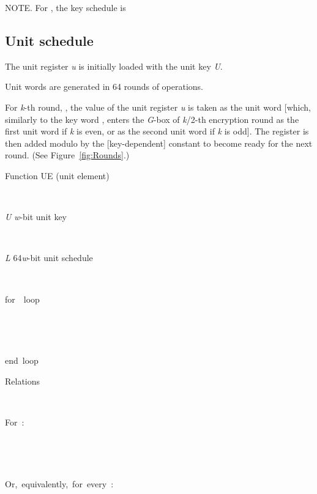 \documentclass[a4paper,oneside,english]{amsart}
\numberwithin{equation}{section}
\numberwithin{figure}{section}
\newenvironment{lyxlist}[1]
{\begin{list}{}
{\settowidth{\labelwidth}{#1}
 \setlength{\leftmargin}{\labelwidth}
 \addtolength{\leftmargin}{\labelsep}
 \renewcommand{\makelabel}[1]{##1\hfil}}}
{\end{list}}
\newenvironment{lyxcode}
{\par\begin{list}{}{
\setlength{\rightmargin}{\leftmargin}
\setlength{\listparindent}{0pt}\raggedright
\setlength{\itemsep}{0pt}
\setlength{\parsep}{0pt}
\normalfont\ttfamily}\item[]}
{\end{list}}
\begin{document}
NOTE. For , the key schedule is





\subsection{Unit schedule}

The unit register \emph{u} is initially loaded with the unit key \emph{U}.

Unit words are generated in 64 rounds of operations. 

For \emph{k}-th round, , the value of the unit register
\emph{u} is taken as the unit word  {[}which, similarly to
the key word , enters the \emph{G}-box of \emph{k}/2-th encryption
round as the first unit word if \emph{k} is even, or as the second
unit word if \emph{k} is odd{]}. The register is then added modulo
 by the {[}key-dependent{]} constant  to become
ready for the next round. (See Figure~\ref{fig:Rounds}.)

\begin{algorithm}


\caption{\label{alg:Function-UE}Function UE (unit element)}

\begin{description}
\item [{Input}]~

\begin{lyxlist}{00.00.0000}
\item [{\emph{U}}] \emph{w}-bit unit key
\end{lyxlist}
\item [{Output}]~

\begin{lyxlist}{00.00.0000}
\item [{\emph{L}}] 64\emph{w}-bit unit schedule
\end{lyxlist}
\item [{Pseudo-code}]~\end{description}
\begin{lyxcode}


for~~loop

~~

~~

end~loop~\end{lyxcode}
\begin{description}
\item [{Relations}]~\end{description}
\begin{lyxcode}


For~:

~~

~~



Or,~equivalently,~for~every~:

~~~\end{lyxcode}
\end{algorithm}
\end{document}
